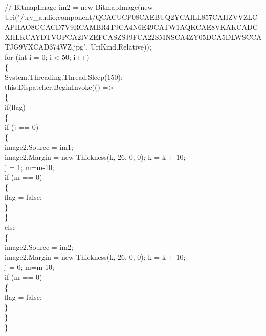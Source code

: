 {{            //  BitmapImage im2 = new BitmapImage(new Uri("/try_audio;component/QCACUCP08CAEBUQ2YCAILL857CAHZVVZLCAPHAO8GCACD7V9RCAMBR4T9CA4N6E49CATW1AQKCAE8VKAKCADCXHLKCAYDTVOPCA2IVZEFCASZSJ9FCA22SMNSCA4ZY05DCA5DLWSCCATJG9VXCAD374WZ.jpg", UriKind.Relative));\\
            for (int i = 0; i < 50; i++)\\
            \{\\

                System.Threading.Thread.Sleep(150);\\

                this.Dispatcher.BeginInvoke(() =>\\
                \{\\
                    if(flag)\\
                    \{\\

                        if (j == 0)\\
                        \{\\
                            image2.Source = im1;\\
                            image2.Margin = new Thickness(k, 26, 0, 0); k = k + 10;\\
                            j = 1; m=m-10;\\
                            if (m == 0)\\
                            \{\\
                                flag = false;\\
                            \}\\


                        \}\\
                        else\\
                        \{\\
                            image2.Source = im2;\\
                            image2.Margin = new Thickness(k, 26, 0, 0); k = k + 10;\\
                            j = 0; m=m-10;\\
                            if (m == 0)\\
                            \{\\
                                flag = false;\\
                            \}\\
                        \}\\
                    \}\\


}}
